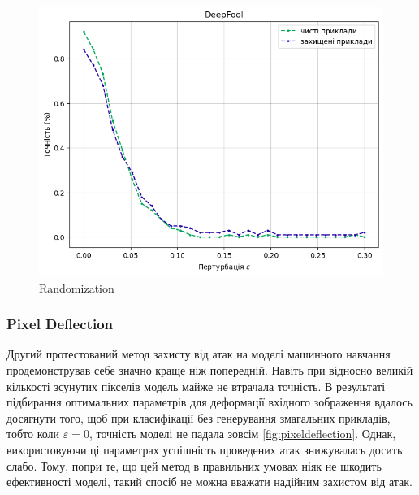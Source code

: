 \documentclass[a4paper,14pt]{extreport}
\begin{document}
\begin{figure}[!htb]
		\endminipage
		\includegraphics[width=1\textwidth]{resources/deepfool_rand_defence.png}
		\endminipage\hfill
		\caption{Randomization}
		\label{fig:randomization}
	\end{figure}

	\subsubsection{Pixel Deflection}
	\noindent
	Другий протестований метод захисту від атак на моделі машинного навчання продемонстрував себе значно краще ніж попередній. Навіть при відносно великій кількості зсунутих пікселів модель майже не втрачала точність. В результаті підбирання оптимальних параметрів для деформації вхідного зображення вдалось досягнути того, щоб при класифікації без генерування змагальних прикладів, тобто коли $\varepsilon=0$, точність моделі не падала зовсім \ref{fig:pixeldeflection}. Однак, використовуючи ці параметрах успішність проведених атак знижувалась досить слабо. Тому, попри те, що цей метод в правильних умовах ніяк не шкодить ефективності моделі, такий спосіб не можна вважати надійним захистом від атак.
	
\end{document}
